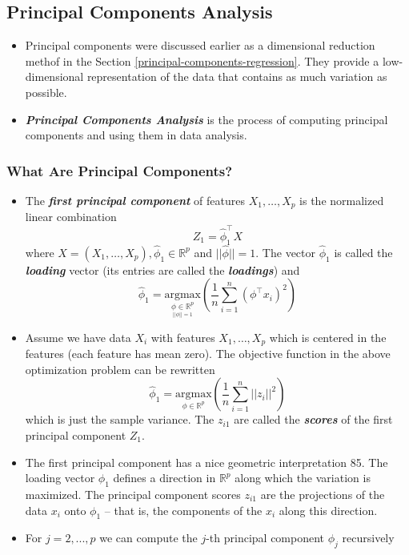 \documentclass[11pt]{article}
\providecommand{\tightlist}{%
      \setlength{\itemsep}{0pt}\setlength{\parskip}{0pt}}
\begin{document}
    \hypertarget{principal-components-analysis}{%
\subsection{Principal Components
Analysis}\label{principal-components-analysis}}

    \begin{itemize}
\tightlist
\item
  Principal components were discussed earlier as a dimensional reduction
  methof in the Section \ref{principal-components-regression}. They
  provide a low-dimensional representation of the data that contains as
  much variation as possible.
\item
  \textbf{\emph{Principal Components Analysis}} is the process of
  computing principal components and using them in data analysis.
\end{itemize}

    \hypertarget{what-are-principal-components}{%
\subsubsection{What Are Principal
Components?}\label{what-are-principal-components}}

    \begin{itemize}
\item
  The \textbf{\emph{first principal component}} of features
  \(X_1, \dots, X_p\) is the normalized linear combination
  \[ Z_1 = \hat{\phi}_1^\top X\] where
  \(X = (X_1, \dots, X_p), \hat{\phi}_1\in \mathbb{R}^p\) and
  \(|| \hat{\phi} || = 1\). The vector \(\hat{\phi}_1\) is called the
  \textbf{\emph{loading}} vector (its entries are called the
  \textbf{\emph{loadings}}) and
  \[ \hat{\phi}_1 = \underset{\underset{||\phi|| = 1}{\phi \in \mathbb{R}^p}}{\text{argmax}}\left(\frac{1}{n}\sum_{i=1}^n \left(\phi^\top x_i\right)^2\right)\]
\item
  Assume we have data \(X_i\) with features \(X_1, \dots, X_p\) which is
  centered in the features (each feature has mean zero). The objective
  function in the above optimization problem can be rewritten
  \[ \hat{\phi}_1 = \underset{\phi \in \mathbb{R}^p}{\text{argmax}}\left(\frac{1}{n}\sum_{i=1}^n ||z_i ||^2\right)\]
  which is just the sample variance. The \(z_{i1}\) are called the
  \textbf{\emph{scores}} of the first principal component \(Z_1\).
\item
  The first principal component has a nice geometric interpretation 85.
  The loading vector \(\phi_{1}\) defines a direction in
  \(\mathbb{R}^p\) along which the variation is maximized. The principal
  component scores \(z_{i1}\) are the projections of the data \(x_i\)
  onto \(\phi_1\) -- that is, the components of the \(x_i\) along this
  direction.
\item
  For \(j = 2,...,p\) we can compute the \(j\)-th principal component
  \(\phi_j\) recursively
\end{itemize}
\end{document}
